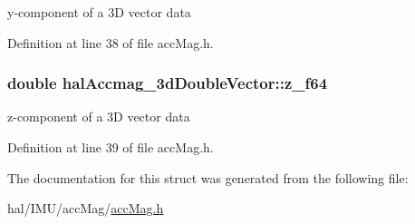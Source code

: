 y-\/component of a 3\+D vector data 



Definition at line 38 of file acc\+Mag.\+h.

\hypertarget{structhalAccmag__3dDoubleVector_a5041b0551694f5f4057a5f3454782e44_a5041b0551694f5f4057a5f3454782e44}{
\subsubsection[{z\+\_\+f64}]{\setlength{\rightskip}{0pt plus 5cm}double hal\+Accmag\+\_\+3d\+Double\+Vector\+::z\+\_\+f64}}\label{structhalAccmag__3dDoubleVector_a5041b0551694f5f4057a5f3454782e44_a5041b0551694f5f4057a5f3454782e44}


z-\/component of a 3\+D vector data 



Definition at line 39 of file acc\+Mag.\+h.



The documentation for this struct was generated from the following file\+:\begin{DoxyCompactItemize}
\item 
hal/\+I\+M\+U/acc\+Mag/\hyperlink{accMag_8h}{acc\+Mag.\+h}\end{DoxyCompactItemize}
